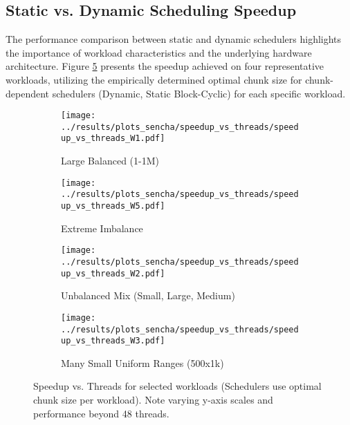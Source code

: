 \documentclass[10pt]{article}
\begin{document}
\subsection{Static vs. Dynamic Scheduling Speedup}
The performance comparison between static and dynamic schedulers highlights the importance of workload characteristics and the underlying hardware architecture. Figure \ref{fig:speedup_comparison_grid} presents the speedup achieved on four representative workloads, utilizing the empirically determined optimal chunk size for chunk-dependent schedulers (Dynamic, Static Block-Cyclic) for each specific workload.

\begin{figure}[H]
    \centering
    \begin{subfigure}[b]{0.49\textwidth}
        \centering
        \texttt{[image: ../results/plots\_sencha/speedup\_vs\_threads/speedup\_vs\_threads\_W1.pdf]}
        \caption{Large Balanced (1-1M)}
        \label{fig:speedup_large_balanced}
    \end{subfigure}
    \hfill %
    \begin{subfigure}[b]{0.49\textwidth}
        \centering
        \texttt{[image: ../results/plots\_sencha/speedup\_vs\_threads/speedup\_vs\_threads\_W5.pdf]}
        \caption{Extreme Imbalance}
        \label{fig:speedup_extreme_imbalance}
    \end{subfigure}

    \vspace{1em} %

    \begin{subfigure}[b]{0.49\textwidth}
        \centering
        \texttt{[image: ../results/plots\_sencha/speedup\_vs\_threads/speedup\_vs\_threads\_W2.pdf]}
        \caption{Unbalanced Mix (Small, Large, Medium)}
        \label{fig:speedup_unbalanced_mix}
    \end{subfigure}
    \hfill %
    \begin{subfigure}[b]{0.49\textwidth}
        \centering
        \texttt{[image: ../results/plots\_sencha/speedup\_vs\_threads/speedup\_vs\_threads\_W3.pdf]}
        \caption{Many Small Uniform Ranges (500x1k)}
        \label{fig:speedup_many_small}
    \end{subfigure}

    \caption{Speedup vs. Threads for selected workloads (Schedulers use optimal chunk size per workload). Note varying y-axis scales and performance beyond 48 threads.}
    \label{fig:speedup_comparison_grid}
\end{figure}
\end{document}

